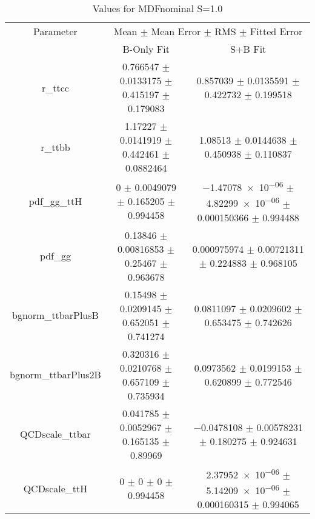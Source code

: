 \begin{table}
\centering
\caption{Values for MDFnominal S=1.0}
\begin{tabular}{ccc}
\toprule
Parameter & \multicolumn{2}{c}{Mean $\pm$ Mean Error $\pm$ RMS $\pm$ Fitted Error}\\
 & B-Only Fit & S+B Fit\\
\midrule
r\_ttcc & \num{0.766547} $\pm$ \num{0.0133175} $\pm$ \num{0.415197} $\pm$ \num{0.179083} & \num{0.857039} $\pm$ \num{0.0135591} $\pm$ \num{0.422732} $\pm$ \num{0.199518}\\
r\_ttbb & \num{1.17227} $\pm$ \num{0.0141919} $\pm$ \num{0.442461} $\pm$ \num{0.0882464} & \num{1.08513} $\pm$ \num{0.0144638} $\pm$ \num{0.450938} $\pm$ \num{0.110837}\\
pdf\_gg\_ttH & \num{0} $\pm$ \num{0.0049079} $\pm$ \num{0.165205} $\pm$ \num{0.994458} & \num{-1.47078e-06} $\pm$ \num{4.82299e-06} $\pm$ \num{0.000150366} $\pm$ \num{0.994488}\\
pdf\_gg & \num{0.13846} $\pm$ \num{0.00816853} $\pm$ \num{0.25467} $\pm$ \num{0.963678} & \num{0.000975974} $\pm$ \num{0.00721311} $\pm$ \num{0.224883} $\pm$ \num{0.968105}\\
bgnorm\_ttbarPlusB & \num{0.15498} $\pm$ \num{0.0209145} $\pm$ \num{0.652051} $\pm$ \num{0.741274} & \num{0.0811097} $\pm$ \num{0.0209602} $\pm$ \num{0.653475} $\pm$ \num{0.742626}\\
bgnorm\_ttbarPlus2B & \num{0.320316} $\pm$ \num{0.0210768} $\pm$ \num{0.657109} $\pm$ \num{0.735934} & \num{0.0973562} $\pm$ \num{0.0199153} $\pm$ \num{0.620899} $\pm$ \num{0.772546}\\
QCDscale\_ttbar & \num{0.041785} $\pm$ \num{0.0052967} $\pm$ \num{0.165135} $\pm$ \num{0.89969} & \num{-0.0478108} $\pm$ \num{0.00578231} $\pm$ \num{0.180275} $\pm$ \num{0.924631}\\
QCDscale\_ttH & \num{0} $\pm$ \num{0} $\pm$ \num{0} $\pm$ \num{0.994458} & \num{2.37952e-06} $\pm$ \num{5.14209e-06} $\pm$ \num{0.000160315} $\pm$ \num{0.994065}\\
\bottomrule
\end{tabular}
\end{table}